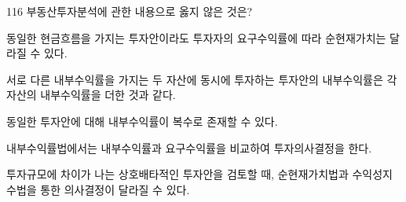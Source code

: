 \begin{question}{116}
부동산투자분석에 관한 내용으로 옳지 않은 것은?
\begin{choices}
  \item 동일한 현금흐름을 가지는 투자안이라도 투자자의 요구수익률에 따라 순현재가치는 달라질 수 있다.
  \item 서로 다른 내부수익률을 가지는 두 자산에 동시에 투자하는 투자안의 내부수익률은 각 자산의 내부수익률을 더한 것과 같다.
  \item 동일한 투자안에 대해 내부수익률이 복수로 존재할 수 있다.
  \item 내부수익률법에서는 내부수익률과 요구수익률을 비교하여 투자의사결정을 한다.
  \item 투자규모에 차이가 나는 상호배타적인 투자안을 검토할 때, 순현재가치법과 수익성지수법을 통한 의사결정이 달라질 수 있다.
\end{choices}
\end{question}
